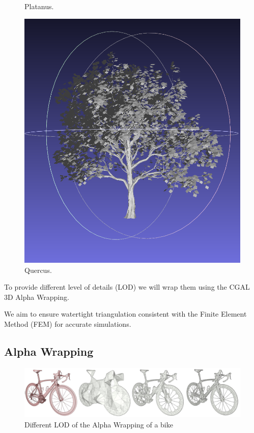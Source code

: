 \documentclass[12pt]{article}
\begin{document}
\begin{figure}[H]
\begin{minipage}{0.24\textwidth}
        \caption{Platanus.}
    \end{minipage}\hfill
    \begin{minipage}{0.24\textwidth}
        \centering
        \includegraphics[width=\textwidth]{images/quercus.png}
        \caption{Quercus.}
    \end{minipage}
\end{figure}

To provide different level of details (LOD) we will wrap them using the
CGAL 3D Alpha Wrapping\cite{cgal_alpha_wrapper}.

We aim to ensure watertight triangulation consistent with the Finite Element Method
(FEM) for accurate simulations.

\subsection{Alpha Wrapping}
\begin{figure}[H]
    \centering
        \centering
        \includegraphics[width=\textwidth]{images/aw3_bike_lod.jpg}
        \caption{Different LOD of the Alpha Wrapping of a bike}
\end{figure}
\end{document}
